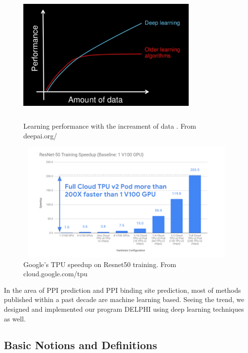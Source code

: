 \begin{figure}[!h]
\begin{center}
\includegraphics[height = 7cm, width = 9cm]{img/data_deeplearning.png}
\caption{Learning performance with the increament of data . From deepai.org/  \label{fig_data_performance}}
\end{center}
\end{figure}

\begin{figure}[h!]
\begin{center}
\includegraphics[height = 6cm, width = 13cm]{img/hardware_speedup.png}
\caption{Google's TPU speedup on Resnet50 training. From cloud.google.com/tpu \label{fig_hardware_speedup}}
\end{center}
\end{figure}

In the area of PPI prediction and PPI binding site prediction, most of methods published within a past decade are machine learning based. Seeing the trend, we designed and implemented our program DELPHI using deep learning techniques as well.

\subsection{Basic Notions and Definitions}
